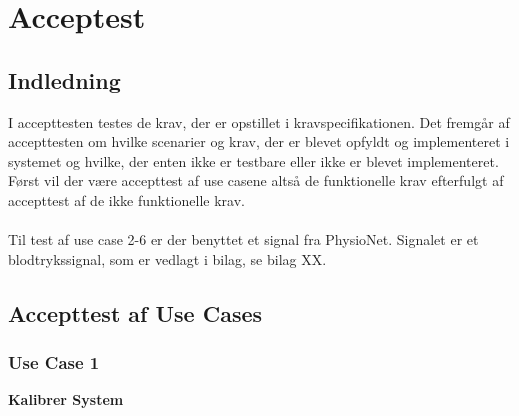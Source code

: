 \chapter{Acceptest}\label{Accepttest}

\section{Indledning}
I accepttesten testes de krav, der er opstillet i kravspecifikationen. Det fremgår af accepttesten om hvilke scenarier og krav, der er blevet opfyldt og implementeret i systemet og hvilke, der enten ikke er testbare eller ikke er blevet implementeret. \\
Først vil der være accepttest af use casene altså de funktionelle krav efterfulgt af accepttest af de ikke funktionelle krav. \\
\\
Til test af use case 2-6 er der benyttet et signal fra PhysioNet. Signalet er et blodtrykssignal, som er vedlagt i bilag, se bilag XX.

\section{Accepttest af Use Cases}


\subsection{Use Case 1}
\textbf{Kalibrer System}

